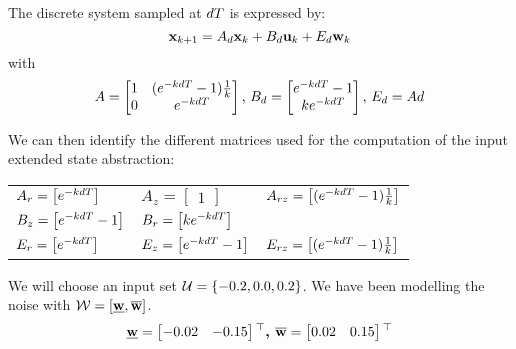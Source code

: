 The discrete system sampled at $dT$ is expressed by:
\begin{equation}
 \mathbf{x}_{k+1} = A_d  \mathbf{x}_k + B_d  \mathbf{u}_k + E_d  \mathbf{w}_k
\end{equation}
with
\begin{equation*} \label{eqn:sec_int_disc}
A = \begin{bmatrix}
1 & (e^{-k dT} - 1)\frac{1}{k}\\ 
0 & e^{-kdT}
\end{bmatrix}
\textrm{, }
B_d = \begin{bmatrix}
e^{-k dT} - 1 \\ 
k e^{-k dT}
\end{bmatrix}
\textrm{, }
E_d = Ad
\end{equation*}

We can then identify the different matrices used for the computation of the input extended state abstraction:\\
\begin{tabular}{lll}
$A_r =  \begin{bmatrix} e^{-kdT} \end{bmatrix} $
&
$A_z =  \begin{bmatrix} 1 \end{bmatrix} $
&
$A_{rz} =  \begin{bmatrix} (e^{-k dT} - 1)\frac{1}{k} \end{bmatrix}$
\\
$B_z =  \begin{bmatrix} e^{-k dT} - 1 \end{bmatrix} $
&
$B_r =  \begin{bmatrix} k e^{-kdT} \end{bmatrix} $
&
\\
$E_r =  \begin{bmatrix} e^{-kdT} \end{bmatrix} $
&
$E_z =  \begin{bmatrix} e^{-k dT} - 1 \end{bmatrix} $
&
$E_{rz} =  \begin{bmatrix} (e^{-k dT} - 1)\frac{1}{k} \end{bmatrix}$
\end{tabular}

We will choose an input set $\mathcal{U} = \{-0.2,0.0,0.2\}$.
We have been modelling the noise with $\mathcal{W} = [\underline{ \mathbf{w}},\overline{ \mathbf{w}}]$.
\begin{equation}
\underline{ \mathbf{w}} = \begin{bmatrix} -0.02&-0.15 \end{bmatrix} {}^\top
\textbf{, }
\overline{ \mathbf{w}} = \begin{bmatrix}  0.02& 0.15 \end{bmatrix} {}^\top
\end{equation}

